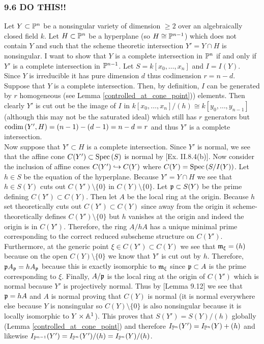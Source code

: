 \documentclass[12pt]{article}
\begin{document}
\subsubsection{9.6 DO THIS!!}

Let $Y \subset \P^n$ be a nonsingular variety of dimension $\ge 2$ over an algebraically closed field $k$. Let $H \subset \P^n$ be a hyperplane (so $H \cong \P^{n-1}$) which does not contain $Y$ and such that the scheme theoretic intersection $Y' =  Y \cap H$ is nonsingular. I want to show that $Y$ is a complete intersection in $\P^n$ if and only if $Y'$ is a complete intersection in $\P^{n-1}$. Let $S = k[x_0, \dots, x_n]$ and $I = I(Y)$.
\bigskip\\
Since $Y$ is irreducible it has pure dimension $d$ thus codimension $r = n - d$. Suppose that $Y$ is a complete intersection. Then, by definition, $I$ can be generated by $r$ homogeneous (see Lemma \ref{controlled_at_cone_point})) elements. Then clearly $Y'$ is cut out be the image of $I$ in $k[x_0, \dots, x_n]/(h) \cong k[y_0, \dots, y_{n-1}]$ (although this may not be the saturated ideal) which still has $r$ generators but $\codim{Y', H} = (n-1) - (d-1) = n - d = r$ and thus $Y'$ is a complete intersection.
\bigskip\\
Now suppose that $Y' \subset H$ is a complete intersection. Since $Y'$ is normal, we see that the affine cone $C(Y') \subset \Spec{S}$ is normal by [Ex. II.8.4(b)]. Now consider the inclusion of affine cones $C(Y') \embed C(Y)$ where $C(Y) =\Spec{S/I(Y)}$. Let $h \in S$ be the equation of the hyperplane. Because $Y' = Y \cap H$ we see that $h \in S(Y)$ cuts out $C(Y') \setminus \{ 0 \}$ in $C(Y) \setminus \{ 0 \}$. Let $\p \subset S(Y)$ be the prime defining $C(Y') \subset C(Y)$. Then let $A$ be the local ring at the origin. Because $h$ set theoretically cuts out $C(Y') \subset C(Y)$ since away from the origin it scheme-theoretically defines $C(Y') \setminus \{ 0 \}$ but $h$ vanishes at the origin and indeed the origin is in $C(Y')$. Therefore, the ring $A/hA$ has a unique minimal prime corresponding to the correct reduced subscheme structure on $C(Y')$. Furthermore, at the generic point $\xi \in C(Y') \subset C(Y)$ we see that $\m_\xi = (h)$ because on the open $C(Y) \setminus \{ 0 \}$ we know that $Y'$ is cut out by $h$. Therefore, $\p A_\p = h A_\p$ because this is exactly isomorphic to $\m_{\xi}$ since $\p \subset A$ is the prime corresponding to $\xi$. Finally, $A / \p$ is the local ring at the origin of $C(Y')$ which is normal because $Y'$ is projectively normal. Thus by [Lemma 9.12] we see that $\p = h A$ and $A$ is normal proving that $C(Y)$ is normal (it is normal everywhere else because $Y$ is nonsingular so $C(Y) \setminus \{ 0 \}$ is also nonsingular because it is locally isomorphic to $Y \times \A^1$). This proves that $S(Y') = S(Y)/(h)$ globally (Lemma \ref{controlled_at_cone_point}) and therefore $I_{\P^n}(Y') = I_{\P^n}(Y) + (h)$ and likewise $I_{\P^{n-1}}(Y') = I_{\P^n}(Y')/(h) = I_{\P^n}(Y)/(h)$. 
\end{document}
